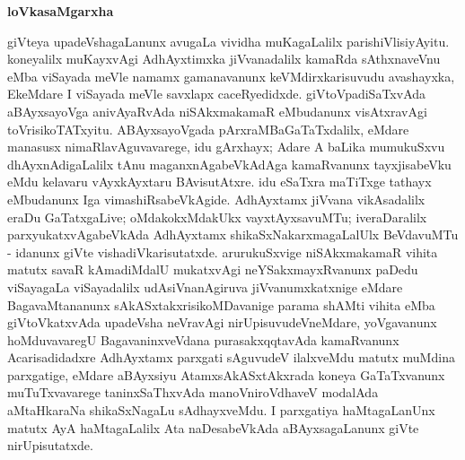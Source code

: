 \begin{center}
\textbf{\Large{loVkasaMgarxha}}
\end{center}

giVteya upadeVshagaLanunx avugaLa vividha muKagaLalilx parishiVlisiyAyitu. koneyalilx muKayxvAgi AdhAyxtimxka jiVvanadalilx kamaRda sAthxnaveVnu eMba viSayada meVle namamx gamanavanunx keVMdirxkarisuvudu avashayxka, EkeMdare I viSayada meVle savxlapx caceRyedidxde. giVtoVpadiSaTxvAda aBAyxsayoVga anivAyaRvAda niSAkxmakamaR eMbudanunx visAtxravAgi toVrisikoTATxyitu. ABAyxsayoVgada pArxraMBaGaTaTxdalilx, eMdare manasusx nimaRlavAguvavarege, idu gArxhayx; Adare A baLika mumukuSxvu dhAyxnAdigaLalilx tAnu maganxnAgabeVkAdAga kamaRvanunx tayxjisabeVku eMdu kelavaru vAyxkAyxtaru BAvisutAtxre. idu eSaTxra maTiTxge tathayx eMbudanunx Iga vimashiRsabeVkAgide. AdhAyxtamx jiVvana vikAsadalilx eraDu GaTatxgaLive; oMdakokxMdakUkx vayxtAyxsavuMTu; iveraDaralilx parxyukatxvAgabeVkAda AdhAyxtamx shikaSxNakarxmagaLalUlx BeVdavuMTu - idanunx giVte vishadiVkarisutatxde. arurukuSxvige niSAkxmakamaR vihita matutx savaR kAmadiMdalU mukatxvAgi neYSakxmayxRvanunx paDedu viSayagaLa viSayadalilx udAsiVnanAgiruva jiVvanumxkatxnige eMdare BagavaMtananunx sAkASxtakxrisikoMDavanige parama shAMti vihita eMba giVtoVkatxvAda upadeVsha neVravAgi nirUpisuvudeVneMdare, yoVgavanunx hoMduvavaregU BagavaninxveVdana purasakxqqtavAda kamaRvanunx Acarisadidadxre AdhAyxtamx parxgati sAguvudeV ilalxveMdu matutx muMdina parxgatige, eMdare aBAyxsiyu AtamxsAkASxtAkxrada koneya GaTaTxvanunx muTuTxvavarege taninxSaThxvAda manoVniroVdhaveV modalAda aMtaHkaraNa shikaSxNagaLu sAdhayxveMdu. I parxgatiya haMtagaLanUnx matutx AyA haMtagaLalilx Ata naDesabeVkAda aBAyxsagaLanunx giVte nirUpisutatxde.

